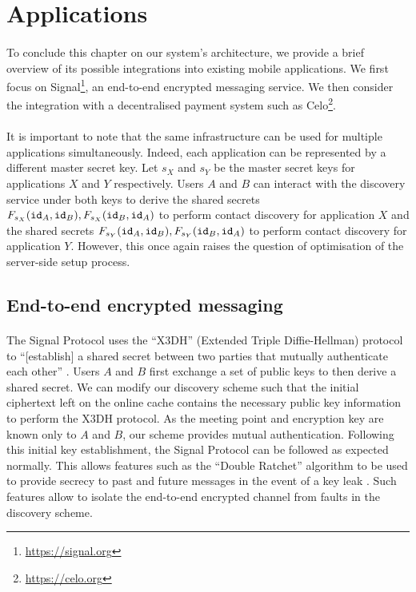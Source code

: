  	


\section{Applications}
\label{sec:applications}

\paragraph{} To conclude this chapter on our system's architecture, we provide a brief overview of its possible integrations into existing mobile applications. We first focus on Signal\footnote{\url{https://signal.org}}, an end-to-end encrypted messaging service. We then consider the integration with a decentralised payment system such as Celo\footnote{\url{https://celo.org}}.

\paragraph{} It is important to note that the same infrastructure can be used for multiple applications simultaneously. Indeed, each application can be represented by a different master secret key. Let $s_X$ and $s_Y$ be the master secret keys for applications $X$ and $Y$ respectively. Users $A$ and $B$ can interact with the discovery service under both keys to derive the shared secrets $F_{s_X}(\mathtt{id}_A, \mathtt{id}_B), F_{s_X}(\mathtt{id}_B, \mathtt{id}_A)$ to perform contact discovery for application $X$ and the shared secrets $F_{s_Y}(\mathtt{id}_A, \mathtt{id}_B), F_{s_Y}(\mathtt{id}_B, \mathtt{id}_A)$ to perform contact discovery for application $Y$. However, this once again raises the question of optimisation of the server-side setup process.

	\subsection{End-to-end encrypted messaging}
	
	\paragraph{} The Signal Protocol uses the ``X3DH'' (Extended Triple Diffie-Hellman) protocol to ``[establish] a shared secret between two parties that mutually authenticate each other'' \cite{Signal:X3DH}. Users $A$ and $B$ first exchange a set of public keys to then derive a shared secret. We can modify our discovery scheme such that the initial ciphertext left on the online cache contains the necessary public key information to perform the X3DH protocol. As the meeting point and encryption key are known only to $A$ and $B$, our scheme provides mutual authentication. Following this initial key establishment, the Signal Protocol can be followed as expected normally. This allows features such as the ``Double Ratchet'' algorithm to be used to provide secrecy to past and future messages in the event of a key leak \cite{Signal:Ratchet}. Such features allow to isolate the end-to-end encrypted channel from faults in the discovery scheme.
	
